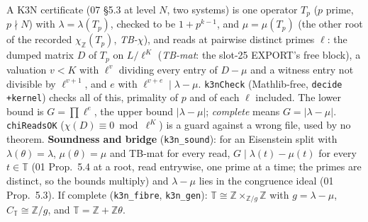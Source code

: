 \begin{definition}\label{chk:hz-k3n}
  \leanok
  A K3N certificate (07 \S5.3 at level $N$, two systems) is one operator $T_p$ ($p$ prime, $p\nmid N$) with $\lambda=\lambda(T_p)$, checked to be
  $1+p^{k-1}$, and $\mu=\mu(T_p)$ (the other root of the recorded $\chi_{\mathbb Z}(T_p)$, \emph{TB-$\chi$}), and reads at pairwise distinct
  primes $\ell$: the dumped matrix $D$ of $T_p$ on $L/\ell^K$ (\emph{TB-mat}: the slot-25 EXPORT's free block), a valuation $v<K$ with
  $\ell^v$ dividing every entry of $D-\mu$ and a witness entry not divisible by $\ell^{v+1}$, and $e$ with $\ell^{v+e}\mid\lambda-\mu$.
  \texttt{k3nCheck} (Mathlib-free, \texttt{decide +kernel}) checks all of this, primality of $p$ and of each $\ell$ included. The lower bound is
  $G=\prod\ell^e$, the upper bound $|\lambda-\mu|$; \emph{complete} means $G=|\lambda-\mu|$. \texttt{chiReadsOK} ($\chi(D)\equiv0\bmod\ell^K$) is a
  guard against a wrong file, used by no theorem. \textbf{Soundness and bridge} (\texttt{k3n\_sound}): for an Eisenstein split with
  $\lambda(\theta)=\lambda$, $\mu(\theta)=\mu$ and TB-mat for every read, $G\mid\lambda(t)-\mu(t)$ for every $t\in\mathbb T$ (01 Prop.~5.4 at a
  root, read entrywise, one prime at a time; the primes are distinct, so the bounds multiply) and $\lambda-\mu$ lies in the congruence ideal
  (01 Prop.~5.3). If complete (\texttt{k3n\_fibre}, \texttt{k3n\_gen}): $\mathbb T\cong\mathbb Z\times_{\mathbb Z/g}\mathbb Z$ with
  $g=\lambda-\mu$, $C_{\mathbb T}\cong\mathbb Z/g$, and $\mathbb T=\mathbb Z+\mathbb Z\theta$.
\end{definition}
